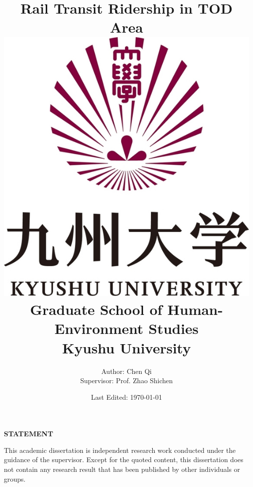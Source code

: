 \documentclass[12pt, twoside, a4paper]{book} %
\begin{document}
\title{
	{\Huge Rail Transit Ridership in TOD Area}\\
	{\vspace{3cm}}
	{\includegraphics[scale=0.2]{university.jpg}}\\
	{\vspace{2cm}}
	{\large Graduate School of Human-Environment Studies}\\
	{\large Kyushu University}
}
\author{
	{\large Author: Chen Qi}\\
	{\large Supervisor: Prof. Zhao Shichen}
	{\vspace{1cm}}
}
\date{\normalsize Last Edited: \today}
\maketitle

%
\centerline{\textbf{\Large STATEMENT}}

This academic dissertation is independent research work conducted under the guidance of the supervisor. Except for the quoted content, this dissertation does not contain any research result that has been published by other individuals or groups.\\
\newline
\newline
\end{document}
